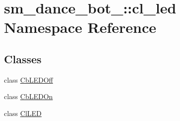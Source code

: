 \hypertarget{namespacesm__dance__bot__3_1_1cl__led}{}\section{sm\+\_\+dance\+\_\+bot\+\_\+:\+:cl\+\_\+led Namespace Reference}
\label{namespacesm__dance__bot__3_1_1cl__led}
\subsection*{Classes}
\begin{DoxyCompactItemize}
\item 
class \hyperlink{classsm__dance__bot__3_1_1cl__led_1_1CbLEDOff}{Cb\+L\+E\+D\+Off}
\item 
class \hyperlink{classsm__dance__bot__3_1_1cl__led_1_1CbLEDOn}{Cb\+L\+E\+D\+On}
\item 
class \hyperlink{classsm__dance__bot__3_1_1cl__led_1_1ClLED}{Cl\+L\+ED}
\end{DoxyCompactItemize}
